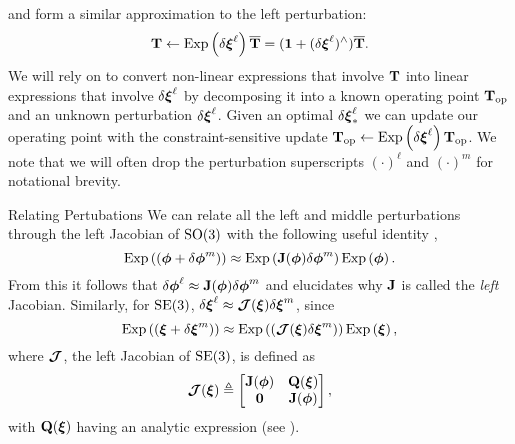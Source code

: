 and form a similar approximation to the left perturbation:
\begin{equation}
	\label{eq:math_se3_perturbations}
	\boldsymbol{\mathbf{T}} \leftarrow \mathrm{Exp}\left({\delta \boldsymbol{\mathbf{\xi}}^\ell}\right) \overline{\boldsymbol{\mathbf{T}}} = (\boldsymbol{\mathbf{1}} + (\delta \boldsymbol{\mathbf{\xi}}^\ell)^\wedge) \overline{\boldsymbol{\mathbf{T}}}.
\end{equation}
We will rely on  to convert non-linear expressions that involve $\boldsymbol{\mathbf{T}}$ into linear expressions that involve $\delta \boldsymbol{\mathbf{\xi}}^\ell$ by decomposing it into a known operating point $\boldsymbol{\mathbf{T}}_\text{op}$ and an unknown perturbation $\delta \boldsymbol{\mathbf{\xi}}^\ell$. Given an optimal $\delta \boldsymbol{\mathbf{\xi}}^\ell_*$ we can update our operating point with the constraint-sensitive update $\boldsymbol{\mathbf{T}}_\text{op} \leftarrow \mathrm{Exp}\left({\delta \boldsymbol{\mathbf{\xi}}^\ell}\right) \boldsymbol{\mathbf{T}}_\text{op}$. We note that we will often drop the perturbation superscripts $(\cdot)^\ell$ and $(\cdot)^m$ for notational brevity.

\begin{remark}{Relating Pertubations}
	We can relate all the left and middle perturbations through the left Jacobian of $\mathrm{SO}(3)$ with the following useful identity \citep{Barfoot2017-ri},
\begin{equation}
\mathrm{Exp}\left({( \boldsymbol{\mathbf{\phi}} + \delta \boldsymbol{\mathbf{\phi}}^m)}\right) \approx \mathrm{Exp}\left({\boldsymbol{\mathbf{J}}(\boldsymbol{\mathbf{\phi}}) \delta \boldsymbol{\mathbf{\phi}}^m}\right) \mathrm{Exp}\left({\boldsymbol{\mathbf{\phi}}}\right).	
\end{equation}
From this it follows that $\delta \boldsymbol{\mathbf{\phi}}^\ell \approx \boldsymbol{\mathbf{J}}(\boldsymbol{\mathbf{\phi}}) \delta \boldsymbol{\mathbf{\phi}}^m$ and elucidates why $\boldsymbol{\mathbf{J}}$ is called the \textit{left} Jacobian. Similarly, for $\mathrm{SE}(3)$, $\delta \boldsymbol{\mathbf{\xi}}^\ell \approx \boldsymbol{\mathbf{\mathcal{J}}}(\boldsymbol{\mathbf{\xi}}) \delta \boldsymbol{\mathbf{\xi}}^m$, since
\begin{equation}
\mathrm{Exp}\left({( \boldsymbol{\mathbf{\xi}} + \delta \boldsymbol{\mathbf{\xi}}^m)}\right) \approx \mathrm{Exp}\left({(\boldsymbol{\mathbf{\mathcal{J}}}(\boldsymbol{\mathbf{\xi}}) \delta \boldsymbol{\mathbf{\xi}}^m)}\right) \mathrm{Exp}\left({\boldsymbol{\mathbf{\xi}}}\right),
\end{equation}
where $\boldsymbol{\mathbf{\mathcal{J}}}$, the left Jacobian of $\mathrm{SE}(3)$, is defined as
\begin{equation}
\boldsymbol{\mathbf{\mathcal{J}}} (\boldsymbol{\mathbf{\xi}}) \triangleq \begin{bmatrix}  \boldsymbol{\mathbf{J}}(\boldsymbol{\mathbf{\phi}}) & \boldsymbol{\mathbf{Q}}(\boldsymbol{\mathbf{\xi}}) \\ \boldsymbol{\mathbf{0}} & \boldsymbol{\mathbf{J}}(\boldsymbol{\mathbf{\phi}}) \end{bmatrix},
\end{equation}
with $\boldsymbol{\mathbf{Q}}(\boldsymbol{\mathbf{\xi}})$ having an analytic expression (see \cite{Barfoot2017-ri}).
\end{remark}


